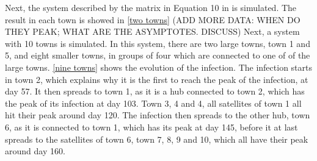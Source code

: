 \documentclass{article}
\begin{document}
    Next, the system described by the matrix in Equation 10 in \cite{exam} is simulated.
    The result in each town is showed in \autoref{two towns}
    (ADD MORE DATA: WHEN DO THEY PEAK; WHAT ARE THE ASYMPTOTES. DISCUSS)
    Next, a system with 10 towns is simulated. 
    In this system, there are two large towns, town 1 and 5, and eight smaller towns, in groups of four which are connected to one of of the large towns.
    \autoref{nine towns} shows the evolution of the infection.
    The infection starts in town 2, which explains why it is the first to reach the peak of the infection, at day 57.
    It then spreads to town 1, as it is a hub connected to town 2, which has the peak of its infection at day 103. 
    Town 3, 4 and 4, all satellites of town 1 all hit their peak around day 120.
    The infection then spreads to the other hub, town 6, as it is connected to town 1, which has its peak at day 145, before it at last spreads to the satellites of town 6, town 7, 8, 9 and 10, which all have their peak around day 160.
\end{document}
